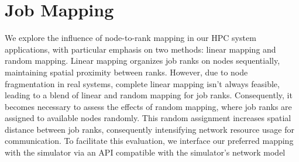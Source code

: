 \section{Job Mapping}
We explore the influence of node-to-rank mapping in our HPC system applications, with particular emphasis on two methods: linear mapping and random mapping. Linear mapping organizes job ranks on nodes sequentially, maintaining spatial proximity between ranks. However, due to node fragmentation in real systems, complete linear mapping isn't always feasible, leading to a blend of linear and random mapping for job ranks. Consequently, it becomes necessary to assess the effects of random mapping, where job ranks are assigned to available nodes randomly. This random assignment increases spatial distance between job ranks, consequently intensifying network resource usage for communication. To facilitate this evaluation, we interface our preferred mapping with the simulator via an API compatible with the simulator's network model

